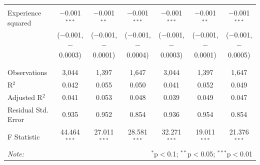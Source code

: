 \documentclass[alpha-refs]{wiley-article-01g}
\begin{document}
\begin{landscape}
\begin{table}[!htbp]
\begin{tabular}{@{\extracolsep{5pt}}lcccccc}
  & & & & & & \\ 
 Experience squared & $-$0.001$^{***}$ & $-$0.001$^{**}$ & $-$0.001$^{***}$ & $-$0.001$^{***}$ & $-$0.001$^{**}$ & $-$0.001$^{***}$ \\ 
  & ($-$0.001, $-$0.0003) & ($-$0.001, $-$0.0001) & ($-$0.001, $-$0.0004) & ($-$0.001, $-$0.0003) & ($-$0.001, $-$0.0001) & ($-$0.001, $-$0.0005) \\ 
  & & & & & & \\ 
\hline \\[-.8ex] 
Observations & 3,044 & 1,397 & 1,647 & 3,044 & 1,397 & 1,647 \\ 
R$^{2}$ & 0.042 & 0.055 & 0.050 & 0.041 & 0.052 & 0.049 \\ 
Adjusted R$^{2}$ & 0.041 & 0.053 & 0.048 & 0.039 & 0.049 & 0.047 \\ 
Residual Std. Error & 0.935 & 0.952 & 0.854 & 0.936 & 0.954 & 0.854 \\ 
F Statistic & 44.464$^{***}$ & 27.011$^{***}$ & 28.581$^{***}$ & 32.271$^{***}$ & 19.011$^{***}$ & 21.376$^{***}$ \\ 
\hline 
\textit{Note:}  & \multicolumn{6}{r}{$^{*}$p$<$0.1; $^{**}$p$<$0.05; $^{***}$p$<$0.01} \\ 
\end{tabular} 
\end{table} 

\end{landscape}

\newpage
\end{document}
